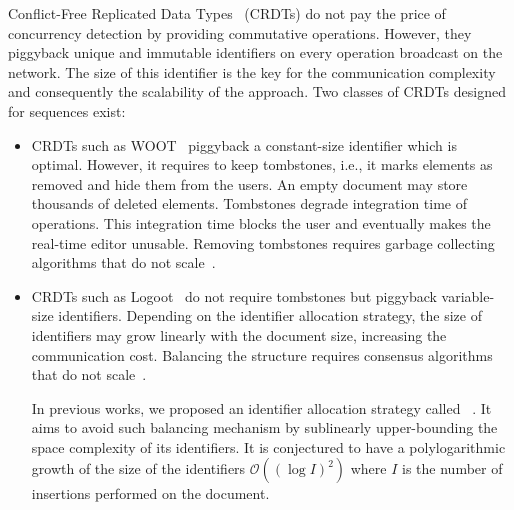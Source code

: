 Conflict-Free Replicated Data Types~\cite{shapiro2011comprehensive} (CRDTs) do
not pay the price of concurrency detection by providing commutative
operations. However, they piggyback unique and immutable identifiers on every
operation broadcast on the network. The size of this identifier is the key for
the communication complexity and consequently the scalability of the
approach. Two classes of CRDTs designed for sequences exist:
\begin{itemize}[noitemsep, leftmargin=*]
\item  CRDTs such as WOOT~\cite{oster2006data} piggyback a constant-size
  identifier which is optimal. However, it requires to keep tombstones, i.e., it
  marks elements as removed and hide them from the users. An empty document may
  store thousands of deleted elements. Tombstones degrade integration time of
  operations. This integration time blocks the user and eventually makes the
  real-time editor unusable. Removing tombstones requires garbage collecting
  algorithms that do not scale~\cite{abdullahi1998garbage}.
\item CRDTs such as Logoot~\cite{weiss2010logootundo} do not require tombstones
  but piggyback variable-size identifiers. Depending on the identifier
  allocation strategy, the size of identifiers may grow linearly with the
  document size, increasing the communication cost. Balancing the structure
  requires consensus algorithms that do not
  scale~\cite{mostefaoui2015signature}.

  In previous works, we proposed an identifier allocation strategy called
  \LSEQ~\cite{nedelec2013concurrency, nedelec2013lseq}. It aims to avoid such
  balancing mechanism by sublinearly upper-bounding the space complexity of its
  identifiers. It is conjectured to have a polylogarithmic growth of the size of
  the identifiers $\mathcal{O}((\log I)^2)$ where $I$ is the number of
  insertions performed on the document.
\end{itemize}


